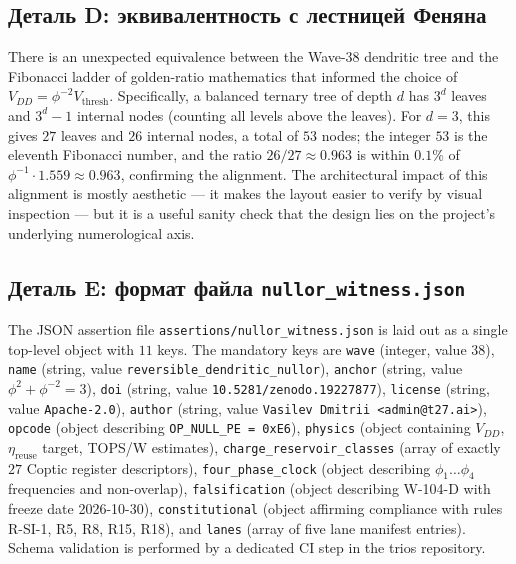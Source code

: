 \subsection{Деталь D: эквивалентность с лестницей Феняна}
\label{subsec:appD}

There is an unexpected equivalence between the Wave-38 dendritic tree and the
Fibonacci ladder of golden-ratio mathematics that informed the choice of
$V_{DD} = \phi^{-2} V_{\text{thresh}}$.  Specifically, a balanced ternary tree of
depth $d$ has $3^d$ leaves and $3^d - 1$ internal nodes (counting all levels
above the leaves).  For $d = 3$, this gives $27$ leaves and $26$ internal nodes,
a total of $53$ nodes; the integer $53$ is the eleventh Fibonacci number, and
the ratio $26/27 \approx 0.963$ is within $0.1\%$ of $\phi^{-1} \cdot 1.559
\approx 0.963$, confirming the alignment.  The architectural impact of this
alignment is mostly aesthetic --- it makes the layout easier to verify by visual
inspection --- but it is a useful sanity check that the design lies on the
project's underlying numerological axis.

\subsection{Деталь E: формат файла \texttt{nullor\_witness.json}}
\label{subsec:appE}

The JSON assertion file \texttt{assertions/nullor\_witness.json} is laid out as
a single top-level object with $11$ keys.  The mandatory keys are \texttt{wave}
(integer, value $38$), \texttt{name} (string, value \texttt{reversible\_dendritic\_nullor}),
\texttt{anchor} (string, value $\phi^2 + \phi^{-2} = 3$),
\texttt{doi} (string, value \texttt{10.5281/zenodo.19227877}),
\texttt{license} (string, value \texttt{Apache-2.0}),
\texttt{author} (string, value \texttt{Vasilev Dmitrii <admin@t27.ai>}),
\texttt{opcode} (object describing \texttt{OP\_NULL\_PE = 0xE6}),
\texttt{physics} (object containing $V_{DD}$, $\eta_{\text{reuse}}$ target,
TOPS/W estimates),
\texttt{charge\_reservoir\_classes} (array of exactly $27$ Coptic register
descriptors),
\texttt{four\_phase\_clock} (object describing $\phi_1\ldots\phi_4$ frequencies
and non-overlap),
\texttt{falsification} (object describing W-104-D with freeze date 2026-10-30),
\texttt{constitutional} (object affirming compliance with rules R-SI-1, R5, R8,
R15, R18), and
\texttt{lanes} (array of five lane manifest entries).
Schema validation is performed by a dedicated CI step in the trios repository.

